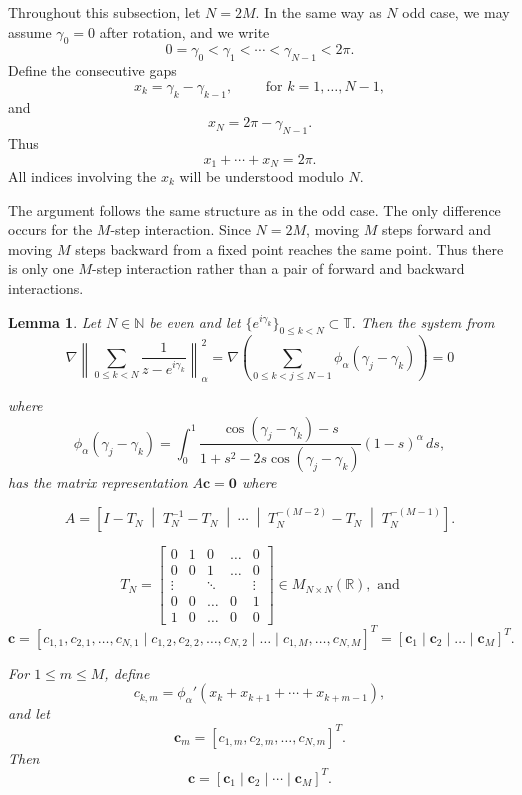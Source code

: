 \documentclass{article}
\newtheorem{lemma}[theorem]{Lemma}
\begin{document}
Throughout this subsection, let
$N=2M$. In the same way as $N$ odd case, we may assume $\gamma_0=0$ after  rotation, and we write
\[
0=\gamma_0<\gamma_1<\cdots<\gamma_{N-1}<2\pi.
\]
Define the consecutive gaps
\[
x_k=\gamma_k-\gamma_{k-1},
\qquad\text{ for } k=1,\dots,N-1,
\]
and
\[
x_N=2\pi-\gamma_{N-1}.
\]
Thus
\[
x_1+\cdots+x_N=2\pi.
\]
All indices involving the $x_k$ will be understood modulo $N$.

The argument follows the same structure as in the odd case. The only difference occurs for the $M$-step interaction. Since $N=2M$, moving $M$ steps forward and moving $M$ steps backward from a fixed point reaches the same point. Thus there is only one $M$-step interaction rather than a pair of forward and backward interactions.

\begin{lemma}
     Let $N\in \mathbb{N}$ be even and let $\{e^{i\gamma_k}\}_{0\leq k < N} \subset \mathbb{T}.$ Then   the system from     
    \[
\nabla\left \|\sum_{0 \leq k < N} \frac{1}{z - e^{i \gamma_k}}\right\|^2_\alpha = \nabla \left( \sum_{0 \leq k < j \leq N-1} \phi_\alpha (\gamma_j - \gamma_k)\right)=0\]

 where $$\phi_\alpha (\gamma_j - \gamma_k) = \int_0^1
\frac{\cos(\gamma_j - \gamma_k)- s}
{1 + s^2 - 2s \cos(\gamma_j - \gamma_k)}(1 - s)^\alpha \, ds, $$
has the matrix representation $A\mathbf{c}=\mathbf{0}$ where

\[
A =
\left[
I - T_N
\;\middle|\;
T_N^{-1} - T_N
\;\middle|\;
\cdots
\;\middle|\;
T_N^{-(M-2)} - T_N
\;\middle|\;
T_N^{-(M-1)}
\right].
\]

$$T_N= \begin{bmatrix} 0 & 1 & 0 & \dots & 0 \\ 0 & 0 & 1 & \dots & 0 \\ \vdots & & \ddots & & \vdots  \\ 0 & 0 & \dots & 0 & 1 \\ 1 & 0 & \dots & 0 & 0 \end{bmatrix} \in M_{N\times N}(\mathbb{R}), \text{ and} $$
$$\mathbf{c}= \left[c_{1,1}, c_{2,1}, \dots, c_{N,1} \mid c_{1,2}, c_{2,2}, \dots, c_{N, 2} \mid \dots \mid c_{1,M}, \dots, c_{N,M}\right]^T =[\mathbf{c}_1 \mid \mathbf{c}_2 \mid \dots \mid \mathbf{c}_M]^T.$$

For $1\leq m\leq M$, define
\[
c_{k,m}
=
\phi_\alpha'
\left(
x_k+x_{k+1}+\cdots+x_{k+m-1}
\right),
\]
and let
\[
\mathbf{c}_m
=
[c_{1,m},c_{2,m},\dots,c_{N,m}]^T.
\]
Then
\[
\mathbf{c}
=
[\mathbf{c}_1\mid\mathbf{c}_2\mid\cdots\mid\mathbf{c}_M]^T.
\]
\end{lemma}
\end{document}
